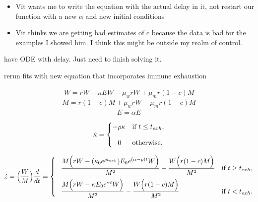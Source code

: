 \documentclass[letterpaper,index=totoc,hyperref,openany]{labbook} %
\newcommand{\researcher}{\subsubsection}
\begin{document}
\researcher{}
\begin{description}
  \item[Project State:]
    \begin{itemize}
    
    \item{Vit wants me to write the equation with the actual delay in it, not restart our function with a new $\alpha$ and new initial conditions}
    
    \item{Vit thinks we are getting bad estimates of c because the data is bad for the examples I showed him. I think this might be outside my realm of control.}
    \end{itemize}
  \item[Current Tasks:]
  \item{have ODE with delay. Just need to finish solving it.}
  \item[Future Tasks:] {rerun fits with new equation that incorporates immune exhaustion}
  \end{description}
  
  
  $$\dot W=  rW- \kappa E W -\mu_w rW + \mu_m r(1-c)M $$
$$\dot M = r(1-c)M  +\mu_w rW -\mu_m r(1-c)M $$
$$\dot E =\alpha E$$




$$\dot \kappa=
\begin{cases}
 -\rho \kappa   &\text{if $t \leq t_{exh}$},\\[2ex]
\hphantom{-}  0  &\text{otherwise}.
\end{cases}$$
  
  $$\dot{z}=\Big( \dfrac{W}{M} \Big)\dfrac{d}{dt} =
\begin{cases}
\hphantom{-} \dfrac{M \Big( rW- (\kappa_0 e^{\rho  t_{exh}})  E_0 e^{(\alpha -\rho) t}  W \Big)}{M^2}-\dfrac{ W \Big(r(1-c)M \Big)}{M^2} &\text{if $t \geq t_{exh}$},\\[2ex]
\hphantom{-} \dfrac{M \Big( rW- \kappa E_0 e^{\alpha t} W \Big)}{M^2}-\dfrac{ W \Big(r(1-c)M \Big)}{M^2}  &\text{if $t < t_{exh}$}.
\end{cases}$$


\printbibliography
\end{document}

